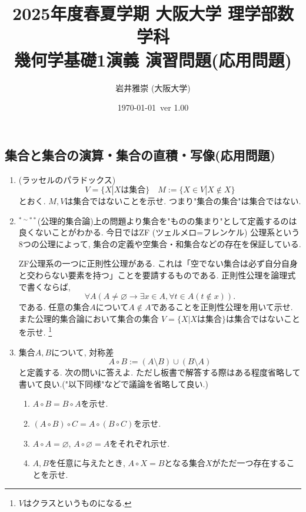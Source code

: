 \documentclass[dvipdfmx,a4paper,11pt]{article}
\title{2025年度春夏学期 大阪大学 理学部数学科 \\ 幾何学基礎1演義 演習問題(応用問題)}
\author{岩井雅崇 (大阪大学)}
\date{\today \, ver 1.00}
\theoremstyle{definition}
\begin{document}
\maketitle
\tableofcontents
\newpage

\begin{center}
\section{集合と集合の演算・集合の直積・写像(応用問題)}
\label{sec-1}
\end{center}

\begin{enumerate}[label=\textbf{問}\ref*{sec-1}.\arabic*]
 \setlength{\parskip}{0cm}
  \setlength{\itemsep}{7pt} 
  \item (ラッセルのパラドックス)　
  $$
  V=\{ X | \text{$X$は集合}\}
  \quad 
 M := \{ X \in V | X \not \in X\}
  $$
  とおく. 
  $M, V$は集合ではないことを示せ. 
  つまり"集合の集合"は集合ではない. 
  
  \item $^{* \sim **}$\label{1-regular}(公理的集合論)上の問題より集合を"ものの集まり"として定義するのは良くないことがわかる. 
  今日ではZF (ツェルメロ=フレンケル) 公理系という8つの公理によって, 集合の定義や空集合・和集合などの存在を保証している. 
  
  ZF公理系の一つに正則性公理がある. これは「空でない集合は必ず自分自身と交わらない要素を持つ」ことを要請するものである. 
 正則性公理を論理式で書くならば, 
$$
\forall A (A \neq \varnothing \rightarrow \exists x \in A, \forall t \in A (t \notin x)).
$$
である. 
任意の集合$A$について$A \not \in A$であることを正則性公理を用いて示せ. 
また公理的集合論において集合の集合 $V=\{ X | \text{$X$は集合}\}$は集合ではないことを示せ. \footnote{$V$はクラスというものになる.}


\item  集合$A, B$について, 対称差
$$
A \circ B := (A \setminus B) \cup (B \setminus A)
$$
と定義する. 次の問いに答えよ. ただし板書で解答する際はある程度省略して書いて良い.("以下同様"などで議論を省略して良い.)
\begin{enumerate}[label=(\arabic*).]
 \setlength{\parskip}{0cm}
  \setlength{\itemsep}{0pt}
\item $A \circ B = B \circ A$を示せ. 
\item $(A \circ B) \circ C = A \circ (B \circ C)$を示せ. 
\item $A \circ A=\varnothing$, $A \circ \varnothing =A$をそれぞれ示せ. 
\item $A, B$を任意に与えたとき, $A \circ X=B$となる集合$X$がただ一つ存在することを示せ.
  \end{enumerate}


\end{enumerate}
\end{document}

